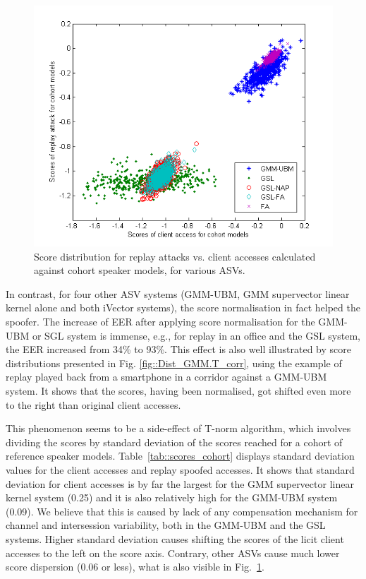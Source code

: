 \begin{figure}
	\includegraphics[width=1\linewidth]{Figs/Scores_cohort.png}

	\caption{Score distribution for replay attacks vs. client accesses calculated against cohort speaker models, for various ASVs.}
	\label{fig::Scores_cohort}
\end{figure}

In contrast, for four other ASV systems (GMM-UBM, GMM supervector linear kernel alone and both iVector systems), the score normalisation in fact helped the spoofer. The increase of EER after applying score normalisation for the GMM-UBM or SGL system is immense, e.g., for replay in an office and the GSL system, the EER increased from 34\% to 93\%. This effect is also well illustrated by score distributions presented in Fig. \ref{fig::Dist_GMM.T_corr}, using the example of replay played back from a smartphone in a corridor against a GMM-UBM system. It shows that the scores, having been normalised, got shifted even more to the right than original client accesses. 

This phenomenon seems to be a side-effect of T-norm algorithm, which involves dividing the scores by standard deviation of the scores reached for a cohort of reference speaker models. Table~\ref{tab::scores_cohort} displays standard deviation values for the client accesses and replay spoofed accesses. It shows that standard deviation for client accesses is by far the largest for the GMM supervector linear kernel system (0.25) and it is also relatively high for the GMM-UBM system (0.09). We believe that this is caused by lack of any compensation mechanism for channel and intersession variability, both in the GMM-UBM and the GSL systems. Higher standard deviation causes shifting the scores of the licit client accesses to the left on the score axis. Contrary, other ASVs cause much lower score dispersion (0.06 or less), what is also visible in Fig.~\ref{fig::Scores_cohort}. 

